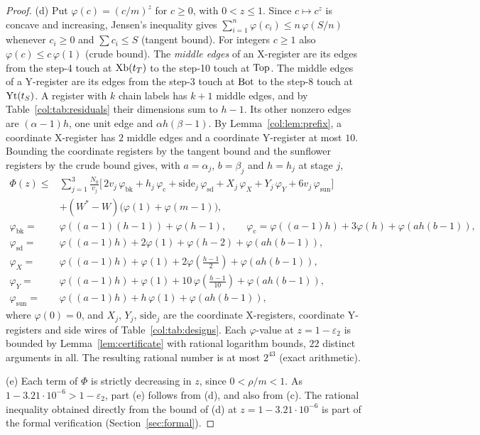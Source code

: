 \begin{proof}
(d) Put $\varphi(c)=(c/m)^z$ for $c\ge0$, with $0<z\le1$. Since $c\mapsto c^z$ is concave and increasing,
Jensen's inequality gives $\sum_{i=1}^{n}\varphi(c_i)\le n\,\varphi(S/n)$ whenever $c_i\ge0$ and $\sum c_i\le S$
(tangent bound). For integers $c\ge1$ also $\varphi(c)\le c\,\varphi(1)$ (crude bound). The \emph{middle
edges} of an X-register are its edges from the step-4 touch at $\mathrm{Xb}(t_T)$ to the step-10 touch at
$\mathrm{Top}$. The middle edges of a Y-register are its edges from the step-3 touch at $\mathrm{Bot}$ to the
step-8 touch at $\mathrm{Yt}(t_S)$. A register with $k$ chain labels has $k+1$ middle edges, and by
Table~\ref{col:tab:residuals} their dimensions sum to $h-1$. Its other nonzero edges are
$(\alpha-1)h$, one unit edge and $\alpha h(\beta-1)$. By Lemma~\ref{col:lem:prefix}, a coordinate
X-register has $2$ middle edges and a coordinate Y-register at most $10$. Bounding
the coordinate registers by the tangent bound and the sunflower registers by the crude bound gives,
with $a=\alpha_j$, $b=\beta_j$ and $h=h_j$ at stage $j$,
\begin{align*}
  \Phi(z)\le{}&\sum_{j=1}^3\frac{N_0}{v_j}\Big[\,2v_j\,\varphi_{\mathrm{bk}}+h_j\,\varphi_{\mathrm{c}}
   +\mathrm{side}_j\,\varphi_{\mathrm{sd}}+X_j\,\varphi_{X}+Y_j\,\varphi_{Y}+6v_j\,\varphi_{\mathrm{sun}}\Big]\\
   &+(W^*-W)\big(\varphi(1)+\varphi(m-1)\big),\\
  \varphi_{\mathrm{bk}}={}&\varphi((a-1)(h-1))+\varphi(h-1),\qquad
  \varphi_{\mathrm{c}}=\varphi((a-1)h)+3\varphi(h)+\varphi(ah(b-1)),\\
  \varphi_{\mathrm{sd}}={}&\varphi((a-1)h)+2\varphi(1)+\varphi(h-2)+\varphi(ah(b-1)),\\
  \varphi_{X}={}&\varphi((a-1)h)+\varphi(1)+2\varphi(\tfrac{h-1}{2})+\varphi(ah(b-1)),\\
  \varphi_{Y}={}&\varphi((a-1)h)+\varphi(1)+10\,\varphi(\tfrac{h-1}{10})+\varphi(ah(b-1)),\\
  \varphi_{\mathrm{sun}}={}&\varphi((a-1)h)+h\,\varphi(1)+\varphi(ah(b-1)),
\end{align*}
where $\varphi(0)=0$, and $X_j$, $Y_j$, $\mathrm{side}_j$ are the coordinate X-registers, coordinate
Y-registers and side wires of Table~\ref{col:tab:designs}. Each $\varphi$-value at $z=1-\varepsilon_2$ is
bounded by Lemma~\ref{lem:certificate} with rational logarithm bounds, $22$ distinct arguments in all.
The resulting rational number is at most $2^{43}$ (exact arithmetic).

(e) Each term of $\Phi$ is strictly decreasing in $z$, since $0<\rho/m<1$. As
$1-3.21\cdot10^{-6}>1-\varepsilon_2$, part (e) follows from (d), and also from (c). The rational inequality
obtained directly from the bound of (d) at $z=1-3.21\cdot10^{-6}$ is part of the formal verification
(Section~\ref{sec:formal}).
\end{proof}


